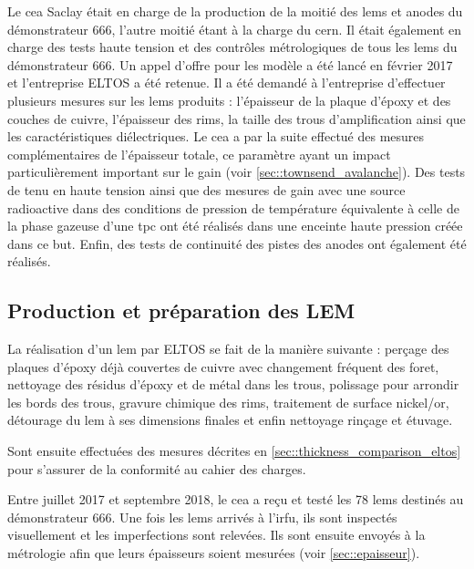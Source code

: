         Le \gls{cea} Saclay était en charge de la production de la moitié des \glspl{lem} et anodes du démonstrateur 666, l'autre moitié étant à la charge du \gls{cern}. Il était également en charge des tests haute tension et des contrôles métrologiques de tous les \glspl{lem} du démonstrateur 666. Un appel d'offre pour les modèle a été lancé en février 2017 et l'entreprise ELTOS a été retenue. Il a été demandé à l'entreprise d'effectuer plusieurs mesures sur les \glspl{lem} produits : l'épaisseur de la plaque d'époxy et des couches de cuivre, l'épaisseur des rims, la taille des trous d'amplification ainsi que les caractéristiques diélectriques. Le \gls{cea} a par la suite effectué des mesures complémentaires de l'épaisseur totale, ce paramètre ayant un impact particulièrement important sur le gain (voir \autoref{sec::townsend_avalanche}). Des tests de tenu en haute tension ainsi que des mesures de gain avec une source radioactive dans des conditions de pression de température équivalente à celle de la phase gazeuse d'une \gls{tpc} ont été réalisés dans une enceinte haute pression créée dans ce but. Enfin, des tests de continuité des pistes des anodes ont également été réalisés.
        
        \subsection{Production et préparation des LEM}
        
            La réalisation d'un \gls{lem} par ELTOS se fait de la manière suivante : perçage des plaques d'époxy déjà couvertes de cuivre avec changement fréquent des foret, nettoyage des résidus d'époxy et de métal dans les trous, polissage pour arrondir les bords des trous, gravure chimique des rims, traitement de surface nickel/or, détourage du \gls{lem} à ses dimensions finales et enfin nettoyage rinçage et étuvage.
                
            Sont ensuite effectuées des mesures décrites en \autoref{sec::thickness_comparison_eltos} pour s'assurer de la conformité au cahier des charges.
            
            Entre juillet 2017 et septembre 2018, le \gls{cea} a reçu et testé les 78 \glspl{lem} destinés au démonstrateur 666. Une fois les \glspl{lem} arrivés à l'\gls{irfu}, ils sont inspectés visuellement et les imperfections sont relevées. Ils sont ensuite envoyés à la métrologie afin que leurs épaisseurs soient mesurées (voir \autoref{sec::epaisseur}).
            
